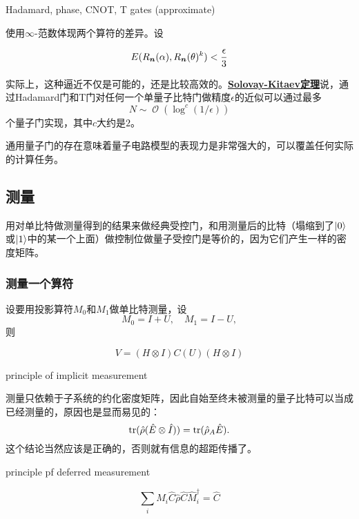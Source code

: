 \documentclass[hyperref, UTF8, a4paper]{ctexart}
\DeclareMathOperator{\bigO}{\mathcal{O}}
\newcommand*{\concept}[1]{\underline{\textbf{#1}}}
\begin{document}
Hadamard, phase, CNOT, T gates (approximate)

使用$\infty$-范数体现两个算符的差异。设

\begin{equation}
    E(R_{\vb*{n}}(\alpha), R_{\vb*{n}}(\theta)^k) < \frac{\epsilon}{3}
\end{equation}

实际上，这种逼近不仅是可能的，还是比较高效的。\concept{Solovay-Kitaev定理}说，通过Hadamard门和T门对任何一个单量子比特门做精度$\epsilon$的近似可以通过最多
\begin{equation}
    N \sim \bigO(\log^c(1/\epsilon))
\end{equation}
个量子门实现，其中$c$大约是$2$。

通用量子门的存在意味着量子电路模型的表现力是非常强大的，可以覆盖任何实际的计算任务。

\subsection{测量}\label{sec:measurement}

用对单比特做测量得到的结果来做经典受控门，和用测量后的比特（塌缩到了$\ket{0}$或$\ket{1}$中的某一个上面）做控制位做量子受控门是等价的，因为它们产生一样的密度矩阵。

\subsubsection{测量一个算符}

设要用投影算符$M_0$和$M_1$做单比特测量，设
\begin{equation}
    M_0 = I + U, \quad M_1 = I - U,
\end{equation}
则

\begin{equation}
    V = (H \otimes I) C(U) (H \otimes I)
\end{equation}

principle of implicit measurement

测量只依赖于子系统的约化密度矩阵，因此自始至终未被测量的量子比特可以当成已经测量的，原因也是显而易见的：
\begin{equation}
    \trace (\hat{\rho}(\hat{E} \otimes \hat{I})) = \trace (\hat{\rho}_A \hat{E}).
\end{equation}
这个结论当然应该是正确的，否则就有信息的超距传播了。

principle pf deferred measurement

\[
    \sum_{i} \hat{M}_i \hat{C} \hat{\rho} \hat{C} \hat{M}_i^\dagger = \hat{C} 
\]
\end{document}
